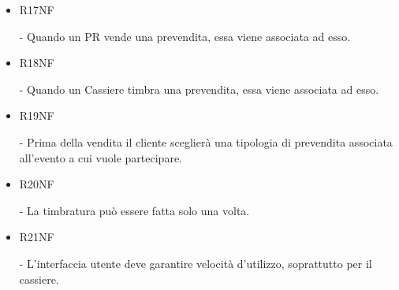 \documentclass[a4paper]{article}
\begin{document}
\begin{itemize}
	\item \hypertarget{R17NF}{R17NF} - Quando un PR vende una prevendita, essa viene associata ad esso.
	\item \hypertarget{R18NF}{R18NF} - Quando un Cassiere timbra una prevendita, essa viene associata ad esso.
	
	\item \hypertarget{R19NF}{R19NF} - Prima della vendita il cliente sceglierà una tipologia di prevendita associata all'evento a cui vuole partecipare.
	
	\item \hypertarget{R20NF}{R20NF} - La timbratura può essere fatta solo una volta.
	
	\item \hypertarget{R21NF}{R21NF} - L'interfaccia utente deve garantire velocità d'utilizzo, soprattutto per il cassiere.
	
	
	
	
	
	
	
	
	
\end{itemize}
\end{document}
